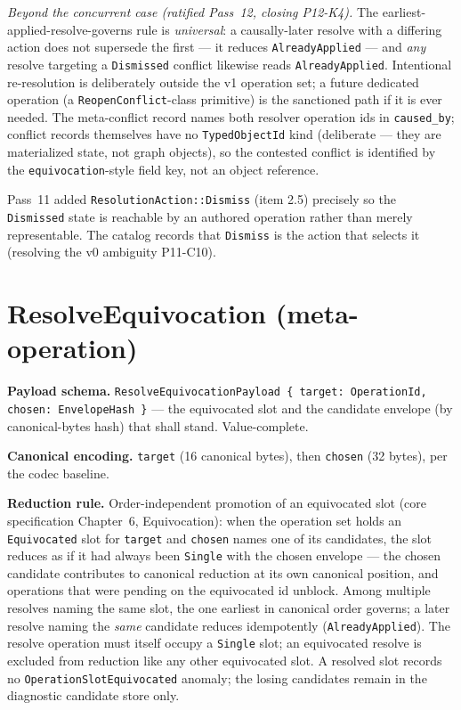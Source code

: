 \documentclass[11pt,letterpaper]{report}
\newcommand{\sectionsc}[1]{{\addfontfeatures{Letters=SmallCaps}#1}}
\begin{document}
\emph{Beyond the concurrent case (ratified Pass~12, closing P12-K4).} The
earliest-applied-resolve-governs rule is \emph{universal}: a causally-later
resolve with a differing action does not supersede the first --- it reduces
\texttt{AlreadyApplied} --- and \emph{any} resolve targeting a
\texttt{Dismissed} conflict likewise reads \texttt{AlreadyApplied}.
Intentional re-resolution is deliberately outside the v1 operation set; a
future dedicated operation (a \texttt{ReopenConflict}-class primitive) is the
sanctioned path if it is ever needed. The meta-conflict record names both
resolver operation ids in \texttt{caused\_by}; conflict records themselves
have no \texttt{TypedObjectId} kind (deliberate --- they are materialized
state, not graph objects), so the contested conflict is identified by the
\texttt{equivocation}-style field key, not an object reference.

\begin{rationale}
Pass~11 added \texttt{ResolutionAction::Dismiss} (item 2.5) precisely so the
\texttt{Dismissed} state is reachable by an authored operation rather than merely
representable. The catalog records that \texttt{Dismiss} is the action that
selects it (resolving the v0 ambiguity P11-C10).
\end{rationale}

\section{ResolveEquivocation (meta-operation)}
\label{sec:k0:resolve-equivocation}

\textbf{Payload schema.} \texttt{ResolveEquivocationPayload \{ target:
OperationId, chosen: EnvelopeHash \}} --- the equivocated slot and the
candidate envelope (by canonical-bytes hash) that shall stand. Value-complete.

\textbf{Canonical encoding.} \texttt{target} (16 canonical bytes), then
\texttt{chosen} (32 bytes), per the codec baseline.

\textbf{Reduction rule.} Order-independent promotion of an equivocated slot
(core specification Chapter~6, \sectionsc{Equivocation}): when the operation
set holds an \texttt{Equivocated} slot for \texttt{target} and \texttt{chosen}
names one of its candidates, the slot reduces as if it had always been
\texttt{Single} with the chosen envelope --- the chosen candidate contributes
to canonical reduction at its own canonical position, and operations that were
pending on the equivocated id unblock. Among multiple resolves naming the same
slot, the one earliest in canonical order governs; a later resolve naming the
\emph{same} candidate reduces idempotently (\texttt{AlreadyApplied}). The
resolve operation must itself occupy a \texttt{Single} slot; an equivocated
resolve is excluded from reduction like any other equivocated slot. A resolved
slot records no \texttt{OperationSlotEquivocated} anomaly; the losing
candidates remain in the diagnostic candidate store only.
\end{document}

